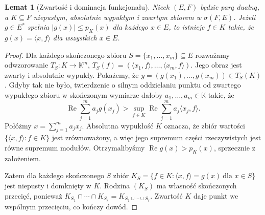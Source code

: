 \documentclass[11pt,a4paper]{article}
\numberwithin{equation}{section}
\theoremstyle{plain}
\newtheorem{lemat}[twierdzenie]{Lemat}
\theoremstyle{definition}
\theoremstyle{remark}
\newcommand{\K}{\mathbb K}
\begin{document}
\begin{lemat}[Zwartość i dominacja funkcjonału]\label{lem:compact-domination}
Niech $(E,F)$ będzie parą dualną, a $K\subseteq F$ niepustym,
absolutnie wypukłym i zwartym zbiorem w $\sigma(F,E)$.
Jeżeli $g\in E^*$ spełnia
$|g(x)|\le p_K(x)$ dla każdego $x\in E$,
to istnieje $f\in K$ takie, że
$g(x)=\langle x,f\rangle$ dla wszystkich $x\in E$.
\end{lemat}
\begin{proof}
Dla każdego skończonego zbioru $S=\{x_1,\ldots,x_m\}\subseteq E$
rozważamy odwzorowanie
$T_S:K\to\K^m$, $T_S(f)=(\langle x_1,f\rangle,\ldots,
\langle x_m,f\rangle)$. Jego obraz jest zwarty i absolutnie wypukły.
Pokażemy, że $y=(g(x_1),\ldots,g(x_m))\in T_S(K)$.
Gdyby tak nie było, twierdzenie o silnym oddzielaniu punktu
od zwartego wypukłego zbioru w skończonym wymiarze dałoby
$a_1,\ldots,a_m\in\K$ takie, że
\[
 \operatorname{Re}\sum_{j=1}^m a_jg(x_j)
 >\sup_{f\in K}\operatorname{Re}
       \sum_{j=1}^m a_j\langle x_j,f\rangle.
\]
Połóżmy $x=\sum_{j=1}^m a_jx_j$.
Absolutna wypukłość $K$ oznacza, że zbiór wartości
$\{\langle x,f\rangle:f\in K\}$ jest zrównoważony,
a więc jego supremum części rzeczywistych jest równe
supremum modułów. Otrzymalibyśmy
$\operatorname{Re}g(x)>p_K(x)$, sprzecznie z założeniem.

Zatem dla każdego skończonego $S$ zbiór
$K_S=\{f\in K:\langle x,f\rangle=g(x)\ \text{dla }x\in S\}$
jest niepusty i domknięty w $K$. Rodzina $(K_S)$ ma
własność skończonych przecięć, ponieważ
$K_{S_1}\cap\cdots\cap K_{S_r}=K_{S_1\cup\cdots\cup S_r}$.
Zwartość $K$ daje punkt we wspólnym przecięciu,
co kończy dowód.
\end{proof}
\end{document}
